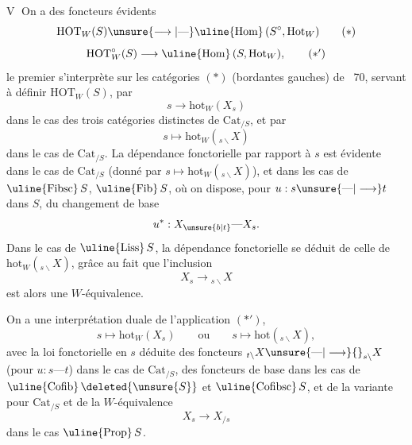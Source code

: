 \textcircled{V} On a des foncteurs évidents
\[
 \mathrm{HOT}_W(S)\unsure{\longrightarrow|\text{---}}\text{\uline{Hom}}\,(S^\circ,\mathrm{Hot}_W)
 \tag*{$(*)$}
\]
\[
 \mathrm{HOT}^\circ_W(S)\longrightarrow\text{\uline{Hom}}\,(S,\mathrm{Hot}_W),
 \tag*{$(*')$}
\]
le premier s'interprète sur les  catégories $(*)$   (bordantes gauches) de ~70,  servant à définir $\mathrm{HOT}_W(S)$, par
\[
 s\longrightarrow\mathrm{hot}_W(X_s)
\]
dans le cas des trois catégories distinctes de $\mathrm{Cat}_{/S}$, et par
\[
 s\longmapsto\mathrm{hot}_W({}_{s\backslash}X)
\]
dans le cas de $\mathrm{Cat}_{/S}$. La dépendance fonctorielle par rapport à $s$ est évidente dans le cas de $\mathrm{Cat}_{/S}$ (donné par $s\mapsto\mathrm{hot}_W({}_{s\backslash}X)$), et dans les cas de $\text{\uline{Fibsc}}\,S$, $\text{\uline{Fib}}\,S$, où on dispose, pour $u:s\unsure{\text{---}|\longrightarrow}t$ dans $S$, du changement de base
\[
 u^*:X_{\unsure{b|t}}\text{---}X_s.
\]
Dans le cas de $\text{\uline{Liss}}\,S$, la dépendance fonctorielle se déduit de celle  de $\mathrm{hot}_W({}_{s\backslash}X)$, grâce au fait que l'inclusion
\[
 X_s\longrightarrow{}_{s\backslash}X
\]
est alors une $W$-équivalence.

On a une interprétation duale de l'application
$(*')$, 
\[
 s\longmapsto\mathrm{hot}_W(X_s)\qquad\text{ou}\qquad s\longmapsto\mathrm{hot}({}_{s\backslash}X),
\]
avec la loi fonctorielle en $s$ déduite des foncteurs ${}_{t\backslash}X\unsure{\text{---}|\longrightarrow}{}_{s\backslash}X$ (pour $u:s\text{---}t$) dans le cas de $\mathrm{Cat}_{/S}$, des foncteurs  de base dans les cas de $\text{\uline{Cofib}}\,\deleted{\unsure{S}}$ et $\text{\uline{Cofibsc}}\,S$, et de la variante pour $\mathrm{Cat}_{/S}$ et de la $W$-équivalence
\[
 X_s\longrightarrow X_{/s}
\]
dans le cas  $\text{\uline{Prop}}\,S$.

